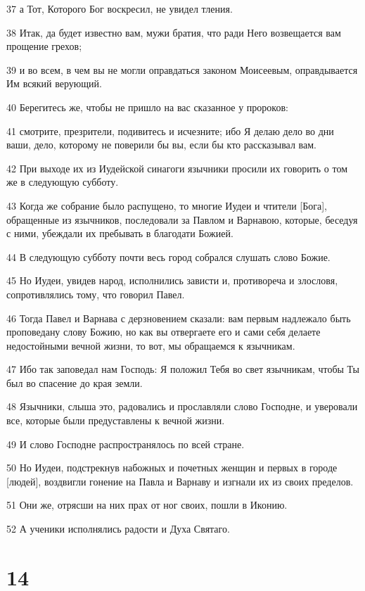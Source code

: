 \par 37 а Тот, Которого Бог воскресил, не увидел тления.
\par 38 Итак, да будет известно вам, мужи братия, что ради Него возвещается вам прощение грехов;
\par 39 и во всем, в чем вы не могли оправдаться законом Моисеевым, оправдывается Им всякий верующий.
\par 40 Берегитесь же, чтобы не пришло на вас сказанное у пророков:
\par 41 смотрите, презрители, подивитесь и исчезните; ибо Я делаю дело во дни ваши, дело, которому не поверили бы вы, если бы кто рассказывал вам.
\par 42 При выходе их из Иудейской синагоги язычники просили их говорить о том же в следующую субботу.
\par 43 Когда же собрание было распущено, то многие Иудеи и чтители [Бога], обращенные из язычников, последовали за Павлом и Варнавою, которые, беседуя с ними, убеждали их пребывать в благодати Божией.
\par 44 В следующую субботу почти весь город собрался слушать слово Божие.
\par 45 Но Иудеи, увидев народ, исполнились зависти и, противореча и злословя, сопротивлялись тому, что говорил Павел.
\par 46 Тогда Павел и Варнава с дерзновением сказали: вам первым надлежало быть проповедану слову Божию, но как вы отвергаете его и сами себя делаете недостойными вечной жизни, то вот, мы обращаемся к язычникам.
\par 47 Ибо так заповедал нам Господь: Я положил Тебя во свет язычникам, чтобы Ты был во спасение до края земли.
\par 48 Язычники, слыша это, радовались и прославляли слово Господне, и уверовали все, которые были предуставлены к вечной жизни.
\par 49 И слово Господне распространялось по всей стране.
\par 50 Но Иудеи, подстрекнув набожных и почетных женщин и первых в городе [людей], воздвигли гонение на Павла и Варнаву и изгнали их из своих пределов.
\par 51 Они же, отрясши на них прах от ног своих, пошли в Иконию.
\par 52 А ученики исполнялись радости и Духа Святаго.

\chapter{14}

